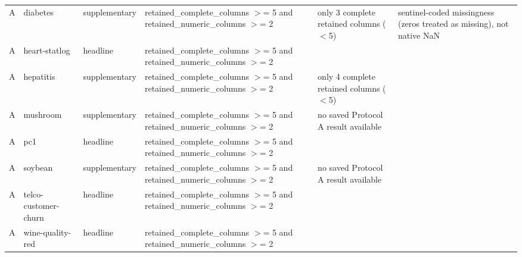 \begin{table}[ht]
\begin{tabular}{llllll}
 A                   & diabetes             & supplementary                         & retained\_complete\_columns \ensuremath{>}= 5 and retained\_numeric\_columns \ensuremath{>}= 2 & only 3 complete retained columns (\ensuremath{<}5)    & sentinel-coded missingness (zeros treated as missing), not native NaN \\
 A                   & heart-statlog        & headline                              & retained\_complete\_columns \ensuremath{>}= 5 and retained\_numeric\_columns \ensuremath{>}= 2 &                                          &                                                                       \\
 A                   & hepatitis            & supplementary                         & retained\_complete\_columns \ensuremath{>}= 5 and retained\_numeric\_columns \ensuremath{>}= 2 & only 4 complete retained columns (\ensuremath{<}5)    &                                                                       \\
 A                   & mushroom             & supplementary                         & retained\_complete\_columns \ensuremath{>}= 5 and retained\_numeric\_columns \ensuremath{>}= 2 & no saved Protocol A result available     &                                                                       \\
 A                   & pc1                  & headline                              & retained\_complete\_columns \ensuremath{>}= 5 and retained\_numeric\_columns \ensuremath{>}= 2 &                                          &                                                                       \\
 A                   & soybean              & supplementary                         & retained\_complete\_columns \ensuremath{>}= 5 and retained\_numeric\_columns \ensuremath{>}= 2 & no saved Protocol A result available     &                                                                       \\
 A                   & telco-customer-churn & headline                              & retained\_complete\_columns \ensuremath{>}= 5 and retained\_numeric\_columns \ensuremath{>}= 2 &                                          &                                                                       \\
 A                   & wine-quality-red     & headline                              & retained\_complete\_columns \ensuremath{>}= 5 and retained\_numeric\_columns \ensuremath{>}= 2 &                                          &                                                                       \\

\end{tabular}
\end{table}
